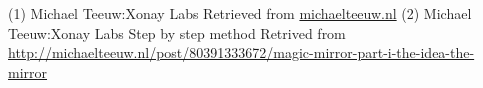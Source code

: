 \documentclass[conference]{IEEEtran}
\begin{document}

%
%
%
\begin{thebibliography}{1}

(1) Michael Teeuw:Xonay Labs Retrieved from \href{michaelteeuw.nl}{michaelteeuw.nl}
(2) Michael Teeuw:Xonay Labs Step by step method Retrived from \href{http://michaelteeuw.nl/post/80391333672/magic-mirror-part-i-the-idea-the-mirror}{http://michaelteeuw.nl/post/80391333672/magic-mirror-part-i-the-idea-the-mirror}

\end{thebibliography}
\end{document}
